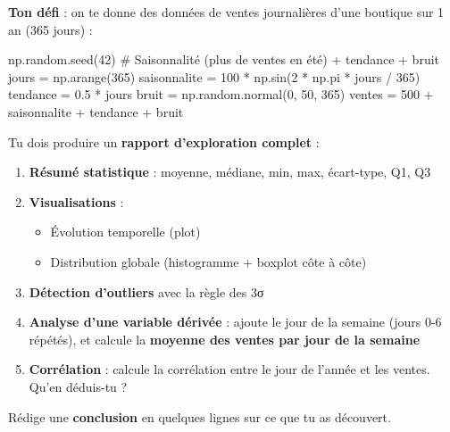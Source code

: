 \documentclass[
  french,
  11pt,
  a4paper,
]{scrbook}
\newenvironment{Shaded}{}{}
\newcommand{\CommentTok}[1]{\textcolor[rgb]{0.42,0.45,0.49}{#1}}
\newcommand{\DecValTok}[1]{\textcolor[rgb]{0.00,0.36,0.77}{#1}}
\newcommand{\FloatTok}[1]{\textcolor[rgb]{0.00,0.36,0.77}{#1}}
\newcommand{\NormalTok}[1]{\textcolor[rgb]{0.14,0.16,0.18}{#1}}
\newcommand{\OperatorTok}[1]{\textcolor[rgb]{0.14,0.16,0.18}{#1}}
\providecommand{\tightlist}{%
  \setlength{\itemsep}{0pt}\setlength{\parskip}{0pt}}
\begin{document}
\begin{tcolorbox}[enhanced jigsaw, arc=.35mm, bottomrule=.15mm, bottomtitle=1mm, breakable, colback=white, colbacktitle=quarto-callout-note-color!10!white, colframe=quarto-callout-note-color-frame, coltitle=black, left=2mm, leftrule=.75mm, opacityback=0, opacitybacktitle=0.6, rightrule=.15mm, title={📝 Énoncé}, titlerule=0mm, toprule=.15mm, toptitle=1mm]

\textbf{Ton défi} : on te donne des données de ventes journalières d'une
boutique sur 1 an (365 jours) :

\begin{Shaded}
\begin{Highlighting}[]
\NormalTok{np.random.seed(}\DecValTok{42}\NormalTok{)}
\CommentTok{\# Saisonnalité (plus de ventes en été) + tendance + bruit}
\NormalTok{jours }\OperatorTok{=}\NormalTok{ np.arange(}\DecValTok{365}\NormalTok{)}
\NormalTok{saisonnalite }\OperatorTok{=} \DecValTok{100} \OperatorTok{*}\NormalTok{ np.sin(}\DecValTok{2} \OperatorTok{*}\NormalTok{ np.pi }\OperatorTok{*}\NormalTok{ jours }\OperatorTok{/} \DecValTok{365}\NormalTok{) }
\NormalTok{tendance }\OperatorTok{=} \FloatTok{0.5} \OperatorTok{*}\NormalTok{ jours}
\NormalTok{bruit }\OperatorTok{=}\NormalTok{ np.random.normal(}\DecValTok{0}\NormalTok{, }\DecValTok{50}\NormalTok{, }\DecValTok{365}\NormalTok{)}
\NormalTok{ventes }\OperatorTok{=} \DecValTok{500} \OperatorTok{+}\NormalTok{ saisonnalite }\OperatorTok{+}\NormalTok{ tendance }\OperatorTok{+}\NormalTok{ bruit}
\end{Highlighting}
\end{Shaded}

Tu dois produire un \textbf{rapport d'exploration complet} :

\begin{enumerate}
\def\labelenumi{\arabic{enumi}.}
\tightlist
\item
  \textbf{Résumé statistique} : moyenne, médiane, min, max, écart-type,
  Q1, Q3
\item
  \textbf{Visualisations} :

  \begin{itemize}
  \tightlist
  \item
    Évolution temporelle (plot)
  \item
    Distribution globale (histogramme + boxplot côte à côte)
  \end{itemize}
\item
  \textbf{Détection d'outliers} avec la règle des 3σ
\item
  \textbf{Analyse d'une variable dérivée} : ajoute le jour de la semaine
  (jours 0-6 répétés), et calcule la \textbf{moyenne des ventes par jour
  de la semaine}
\item
  \textbf{Corrélation} : calcule la corrélation entre le jour de l'année
  et les ventes. Qu'en déduis-tu ?
\end{enumerate}

Rédige une \textbf{conclusion} en quelques lignes sur ce que tu as
découvert.

\end{tcolorbox}
\end{document}
